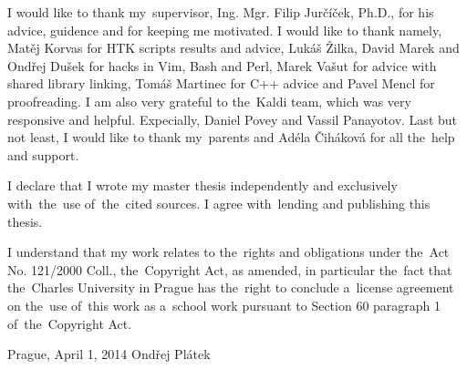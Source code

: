 \newpage

\normalsize %
\vspace{10mm} 

\noindent I would like to thank my~supervisor, Ing. Mgr. Filip Jurčíček, Ph.D., for his advice, guidence and 
for keeping me motivated. 
I would like to thank namely, Matěj Korvas for HTK scripts results and advice, 
Lukáš Žilka, David Marek and Ondřej Dušek for hacks in Vim, Bash and Perl, 
Marek Vašut for advice with shared library linking, Tomáš Martinec for C++ advice
and Pavel Mencl for proofreading.
I am also very grateful to the~Kaldi team, which was very responsive and helpful.
Expecially, Daniel Povey and  Vassil Panayotov. 
Last but not least, I would like to thank my~parents and Adéla Čiháková for all the~help and support.


\vspace{\fill} %
\medskip\noindent
I declare that I wrote my master thesis independently and exclusively with~the~use of~the~cited sources. I agree with~lending and publishing this thesis.

I understand that my work relates to the~rights and obligations under the~Act No. 121/2000 Coll., the~Copyright Act, as amended, in particular the~fact that the~Charles University in Prague has the~right to conclude a~license agreement on the~use of~this work as a~school work pursuant to Section 60 paragraph 1 of~the~Copyright Act.

\noindent Prague, April 1, 2014 \hspace{\fill}Ondřej Plátek 


\newpage

